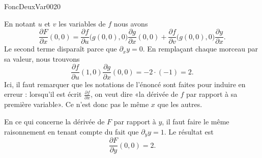 
\begin{corrige}{FoncDeuxVar0020}

	En notant $u$ et $v$ les variables de $f$ nous avons
	\begin{equation}
		\frac{ \partial F }{ \partial x }(0,0)=\frac{ \partial f }{ \partial u }\big( g(0,0),0 \big)\frac{ \partial g }{ \partial x }(0,0)
		+\frac{ \partial f }{ \partial v }\big( g(0,0),0 \big)\frac{ \partial y }{ \partial x }.
	\end{equation}
	Le second terme disparaît parce que $\partial_xy=0$. En remplaçant chaque morceau par sa valeur, nous trouvons
	\begin{equation}
		\frac{ \partial f }{ \partial u }(1,0)\frac{ \partial g }{ \partial x }(0,0)=-2\cdot(-1)=2.
	\end{equation}
	Ici, il faut remarquer que les notations de l'énoncé sont faites pour induire en erreur : lorsqu'il est écrit $\frac{ \partial f }{ \partial x }$, on veut dire «la dérivée de $f$ par rapport à sa première variable». Ce n'est donc pas le même $x$ que les autres.

	En ce qui concerne la dérivée de $F$ par rapport à $y$, il faut faire le même raisonnement en tenant compte du fait que $\partial_yy=1$. Le résultat est
	\begin{equation}
		\frac{ \partial F }{ \partial y }(0,0)=2.
	\end{equation}
	

\end{corrige}

